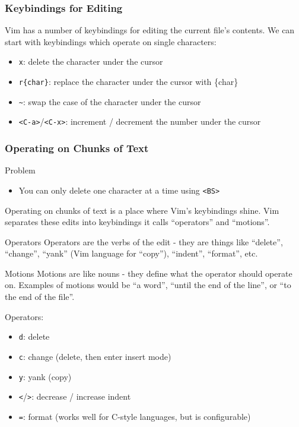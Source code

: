 \documentclass{beamer}
\begin{document}
\begin{frame}[fragile]
    \frametitle{Keybindings for Editing}
    \small
    Vim has a number of keybindings for editing the current file's contents. We can start with keybindings which operate on single characters:
    \begin{itemize}
	\item \verb+x+:  delete the character under the cursor
	\item \verb+r{char}+:  replace the character under the cursor with \{char\}
	\item \verb+~+:  swap the case of the character under the cursor
	\item \verb+<C-a>+/\verb+<C-x>+:  increment / decrement the number under the cursor
    \end{itemize}
\end{frame}

\begin{frame}[fragile]
    \frametitle{Operating on Chunks of Text}
    \small
    \begin{block}{Problem}
	\begin{itemize}
	    \item You can only delete one character at a time using \verb+<BS>+
	\end{itemize}
    \end{block}
    Operating on chunks of text is a place where Vim's keybindings shine. Vim separates these edits into keybindings it calls \enquote{operators} and \enquote{motions}.
    \begin{block}{Operators}
	Operators are the verbs of the edit - they are things like \enquote{delete}, \enquote{change}, \enquote{yank} (Vim language for \enquote{copy}), \enquote{indent}, \enquote{format}, etc.
    \end{block}
    \begin{block}{Motions}
	Motions are like nouns - they define what the operator should operate on. Examples of motions would be \enquote{a word}, \enquote{until the end of the line}, or \enquote{to the end of the file}.
    \end{block}
\end{frame}

\begin{frame}[fragile]
    \small
    Operators:
    \begin{itemize}
	\item \verb+d+:  delete
	\item \verb+c+:  change (delete, then enter insert mode)
	\item \verb+y+:  yank (copy)
	\item \verb+<+/\verb+>+:  decrease / increase indent
	\item \verb+=+:  format (works well for C-style languages, but is configurable)
    \end{itemize}
\end{frame}
\end{document}
